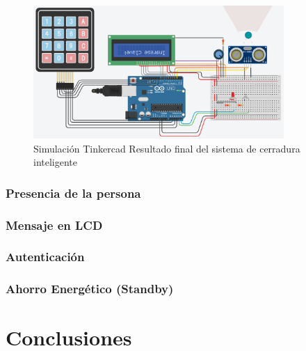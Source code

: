 \documentclass{article}
\begin{document}
\begin{figure}[H]
    \centering
    \includegraphics[width=0.85\textwidth]{./img/ckpt_6.png}
    \caption{Simulación Tinkercad Resultado final del sistema de cerradura inteligente}
    \label{fig:cerradura_smart}
\end{figure}

\subsubsection{Presencia de la persona}

\subsubsection{Mensaje en LCD}

\subsubsection{Autenticación}

\subsubsection{Ahorro Energético (Standby)}

\section{Conclusiones}
\end{document}
